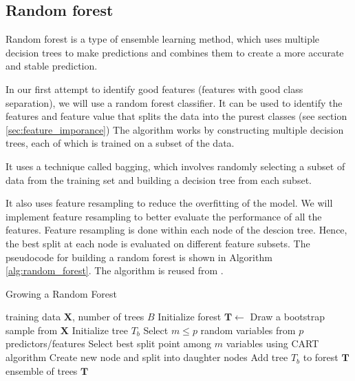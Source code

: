 \subsection{Random forest} \label{sec:method_random_forest} 
Random forest is a type of ensemble learning method, which uses multiple
decision trees to make predictions and combines them to create a more accurate
and stable prediction. 

In our first attempt to identify good features (features with good
class separation), we will use a random forest classifier. 
It can be used to identify the features and feature value that splits the data
into the purest classes (see section \ref{sec:feature_imporance})
The algorithm works by constructing multiple decision trees, each of which is trained 
on a subset of the data. 

It uses a technique called bagging, which involves
randomly selecting a subset of data from the training set and building a
decision tree from each subset. 

It also uses feature resampling to reduce the
overfitting of the model. We will implement feature resampling
to better evaluate the performance of all the features. Feature resampling is
done within each node of the descion tree. Hence, the best split at each node is
evaluated on different feature subsets. The pseudocode for building a random
forest is shown in Algorithm \ref{alg:random_forest}. The algorithm is reused
from \cite{w44}.  


\begin{algorithm}
\caption{Growing a Random Forest} \label{alg:random_forest} 
\begin{algorithmic}[1]
 training data $\boldsymbol{X}$, number of trees $B$
\State Initialize forest $\bm{T} \gets {}$
\State Draw a bootstrap sample from $\boldsymbol{X}$
\State Initialize tree $T_b$
\State Select $m \leq p$ random variables from $p$ predictors/features
\State Select best split point among $m$ variables using CART algorithm
\State Create new node and split into daughter nodes
\EndWhile
\State Add tree $T_b$ to forest $\bm{T}$
\EndFor
{} ensemble of trees $\bm{T}$
\end{algorithmic}
\end{algorithm}



